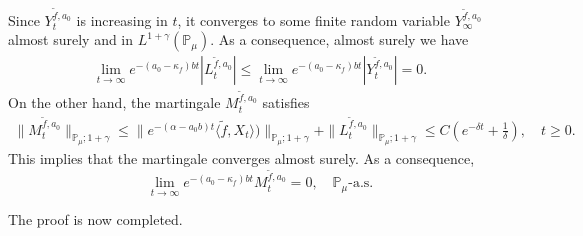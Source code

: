 \documentclass[12pt,a4paper]{amsart}
\theoremstyle{plain}
\theoremstyle{definition}
\numberwithin{equation}{section}
\begin{document}
Since $Y_t^{\tilde{f},a_0}$ is increasing in $t$, it converges to some finite random variable $Y_{\infty}^{\tilde{f},a_0}$ almost surely and in $L^{1+\gamma}(\mathbb{P}_{\mu})$.
	As a consequence, almost surely we have
\begin{align*}
    \lim_{t\rightarrow \infty}e^{-(a_0 - \kappa_f)bt}|L_t^{\tilde{f},a_0}|
    \leq  \lim_{t\rightarrow \infty}e^{-(a_0 - \kappa_f)bt}|Y_t^{\tilde{f},a_0}|=0.
\end{align*}
	On the other hand, the martingale $M_t^{\tilde{f},a_0}$ satisfies
\begin{align*}
    \|M_t^{\tilde{f},a_0}\|_{\mathbb{P}_{\mu};1+\gamma}\leq  \|e^{-(\alpha-a_0 b)t}\langle \tilde{f},X_t\rangle)\|_{\mathbb{P}_{\mu};1+\gamma}+\|L_t^{\tilde{f},a_0}\|_{\mathbb{P}_{\mu};1+\gamma}\leq C(e^{-\delta t}+\frac{1}{\delta}),\quad t\geq 0.
\end{align*}
	This implies that the martingale converges almost surely.
	As a consequence,
\[
	\lim_{t\rightarrow\infty} e^{-(a_0-\kappa_f)bt}M_t^{\tilde{f},a_0}
	=0,
	\quad \mathbb P_\mu\text{-a.s.}
\]
	
	The proof is now completed.
\end{document}
